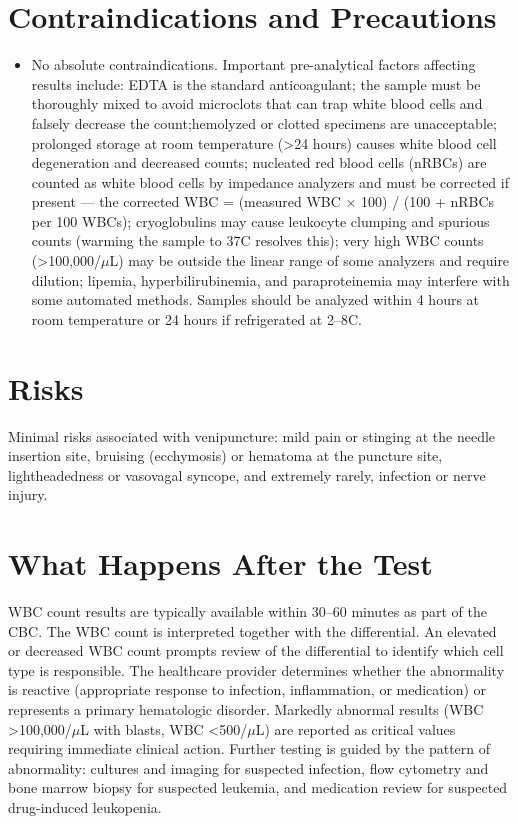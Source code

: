 \section*{Contraindications and Precautions}
\begin{itemize}
  \item No absolute contraindications. Important pre-analytical factors affecting results include: EDTA is the standard anticoagulant; the sample must be thoroughly mixed to avoid microclots that can trap white blood cells and falsely decrease the count;hemolyzed or clotted specimens are unacceptable; prolonged storage at room temperature (>24 hours) causes white blood cell degeneration and decreased counts; nucleated red blood cells (nRBCs) are counted as white blood cells by impedance analyzers and must be corrected if present --- the corrected WBC = (measured WBC $\times$ 100) / (100 + nRBCs per 100 WBCs); cryoglobulins may cause leukocyte clumping and spurious counts (warming the sample to 37\textdegree{}C resolves this); very high WBC counts (>100,000/$\mu$L) may be outside the linear range of some analyzers and require dilution; lipemia, hyperbilirubinemia, and paraproteinemia may interfere with some automated methods. Samples should be analyzed within 4 hours at room temperature or 24 hours if refrigerated at 2--8\textdegree{}C.
\end{itemize}
\section*{Risks}
Minimal risks associated with venipuncture: mild pain or stinging at the needle insertion site, bruising (ecchymosis) or hematoma at the puncture site, lightheadedness or vasovagal syncope, and extremely rarely, infection or nerve injury.

\section*{What Happens After the Test}
WBC count results are typically available within 30--60 minutes as part of the CBC. The WBC count is interpreted together with the differential. An elevated or decreased WBC count prompts review of the differential to identify which cell type is responsible. The healthcare provider determines whether the abnormality is reactive (appropriate response to infection, inflammation, or medication) or represents a primary hematologic disorder. Markedly abnormal results (WBC >100,000/$\mu$L with blasts, WBC <500/$\mu$L) are reported as critical values requiring immediate clinical action. Further testing is guided by the pattern of abnormality: cultures and imaging for suspected infection, flow cytometry and bone marrow biopsy for suspected leukemia, and medication review for suspected drug-induced leukopenia.

